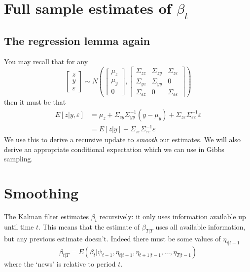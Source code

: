 \documentclass[
  letterpaper,
]{book}
\begin{document}
\hypertarget{full-sample-estimates-of-beta_t}{%
\section{\texorpdfstring{Full sample estimates of
\(\beta_t\)}{Full sample estimates of \textbackslash beta\_t}}\label{full-sample-estimates-of-beta_t}}

\hypertarget{the-regression-lemma-again}{%
\subsection{The regression lemma
again}\label{the-regression-lemma-again}}

You may recall that for any \begin{equation}
\begin{bmatrix} z \\ y \\ \varepsilon \end{bmatrix}
\sim N\left(\begin{bmatrix} \mu_z \\ \mu_y \\ 0 \end{bmatrix},
\begin{bmatrix}
\Sigma_{zz} & \Sigma_{zy} & \Sigma_{z\varepsilon } \\
\Sigma_{yz} & \Sigma_{yy} & 0 \\
\Sigma_{\varepsilon z} & 0 & \Sigma_{\varepsilon\varepsilon}
\end{bmatrix}\right)
\end{equation} then it must be that \begin{align}
E[z|y,\varepsilon] &= \mu_z + \Sigma_{zy}\Sigma_{yy}^{-1}(y-\mu_y) + \Sigma_{z\varepsilon}\Sigma_{\varepsilon\varepsilon}^{-1}\varepsilon \\
&= E[z|y] + \Sigma_{z\varepsilon}\Sigma_{\varepsilon\varepsilon }^{-1}\varepsilon
\end{align} We use this to derive a recursive update to \emph{smooth}
our estimates. We will also derive an appropriate conditional
expectation which we can use in Gibbs sampling.

\hypertarget{smoothing}{%
\section{Smoothing}\label{smoothing}}

The Kalman filter estimates \(\beta_t\) recursively: it only uses
information available up until time \(t\). This means that the estimate
of \(\beta_{T|T}\) uses all available information, but any previous
estimate doesn't. Indeed there must be some values of \(\eta_{i|t-1}\)
\begin{equation}
   \beta_{t|T} = E(\beta_t | \psi_{t-1}, \eta_{t|t-1}, \eta_{t+1|t-1},...,\eta_{T|t-1})
\end{equation} where the `news' is relative to period \(t\).
\end{document}

